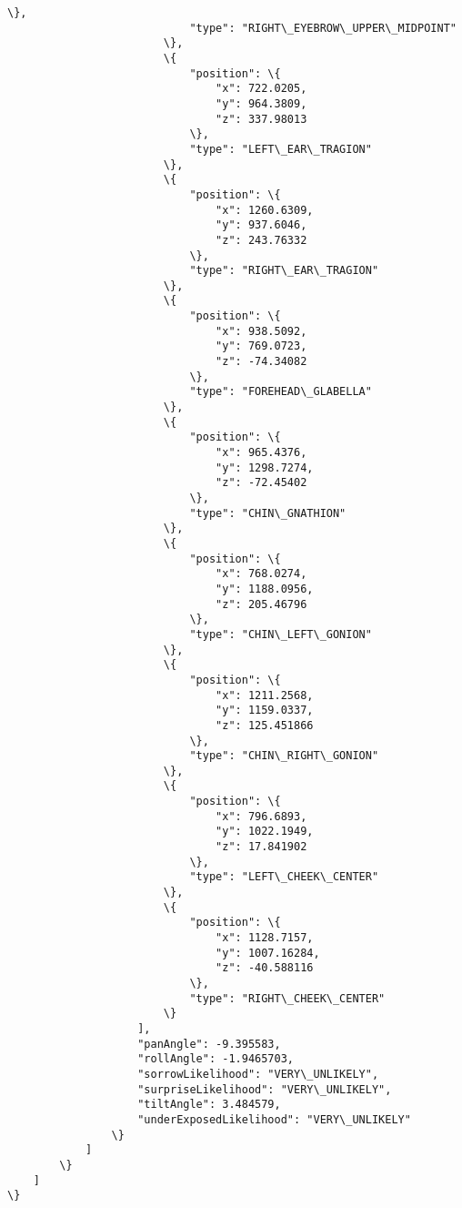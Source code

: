 \documentclass[11pt]{article}
\begin{document}
\begin{Verbatim}[commandchars=\\\{\}]
                            \},
                            "type": "RIGHT\_EYEBROW\_UPPER\_MIDPOINT"
                        \},
                        \{
                            "position": \{
                                "x": 722.0205,
                                "y": 964.3809,
                                "z": 337.98013
                            \},
                            "type": "LEFT\_EAR\_TRAGION"
                        \},
                        \{
                            "position": \{
                                "x": 1260.6309,
                                "y": 937.6046,
                                "z": 243.76332
                            \},
                            "type": "RIGHT\_EAR\_TRAGION"
                        \},
                        \{
                            "position": \{
                                "x": 938.5092,
                                "y": 769.0723,
                                "z": -74.34082
                            \},
                            "type": "FOREHEAD\_GLABELLA"
                        \},
                        \{
                            "position": \{
                                "x": 965.4376,
                                "y": 1298.7274,
                                "z": -72.45402
                            \},
                            "type": "CHIN\_GNATHION"
                        \},
                        \{
                            "position": \{
                                "x": 768.0274,
                                "y": 1188.0956,
                                "z": 205.46796
                            \},
                            "type": "CHIN\_LEFT\_GONION"
                        \},
                        \{
                            "position": \{
                                "x": 1211.2568,
                                "y": 1159.0337,
                                "z": 125.451866
                            \},
                            "type": "CHIN\_RIGHT\_GONION"
                        \},
                        \{
                            "position": \{
                                "x": 796.6893,
                                "y": 1022.1949,
                                "z": 17.841902
                            \},
                            "type": "LEFT\_CHEEK\_CENTER"
                        \},
                        \{
                            "position": \{
                                "x": 1128.7157,
                                "y": 1007.16284,
                                "z": -40.588116
                            \},
                            "type": "RIGHT\_CHEEK\_CENTER"
                        \}
                    ],
                    "panAngle": -9.395583,
                    "rollAngle": -1.9465703,
                    "sorrowLikelihood": "VERY\_UNLIKELY",
                    "surpriseLikelihood": "VERY\_UNLIKELY",
                    "tiltAngle": 3.484579,
                    "underExposedLikelihood": "VERY\_UNLIKELY"
                \}
            ]
        \}
    ]
\}
    \end{Verbatim}
\end{document}
